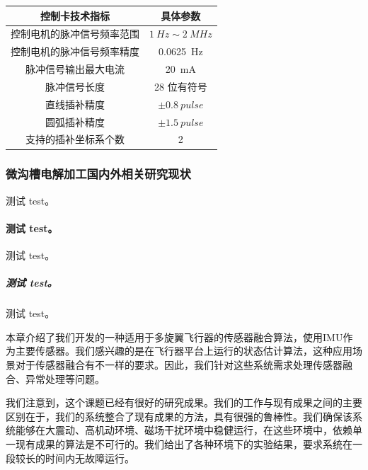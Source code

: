 \documentclass[
  type=master
]{gdutthesis}
\begin{document}
\begin{table}
  \label{tab:example}
  \begin{tabular}{cc}
    \toprule
    控制卡技术指标              & 具体参数                      \\
    \midrule
    控制电机的脉冲信号频率范围  & $\SI{1}{Hz}\sim\SI{2}{MHz}$ \\
    控制电机的脉冲信号频率精度  & \SI{0.0625}{Hz}              \\
    脉冲信号输出最大电流        & \SI{20}{mA}                  \\
    脉冲信号长度                & 28 位有符号                   \\
    直线插补精度                & $\pm \SI{0.8}{pulse}$        \\
    圆弧插补精度                & $\pm \SI{1.5}{pulse}$        \\
    支持的插补坐标系个数        & 2                             \\
    \bottomrule
  \end{tabular}
\end{table}


\subsubsection{微沟槽电解加工国内外相关研究现状}
测试 test。
\paragraph{测试 test。}
测试 test。
\subparagraph{测试 test。}
测试 test\cite{woerdelun2012jingji}。

本章介绍了我们开发的一种适用于多旋翼飞行器的传感器融合算法，使用IMU作为主要传感器。我们感兴趣的是在飞行器平台上运行的状态估计算法，这种应用场景对于传感器融合有不一样的要求。因此，我们针对这些系统需求处理传感器融合、异常处理等问题。\par
我们注意到，这个课题已经有很好的研究成果\cite{mahony2008nonlinear,hua2010attitude,khosravian2016state}。我们的工作与现有成果之间的主要区别在于，我们的系统整合了现有成果的方法，具有很强的鲁棒性。我们确保该系统能够在大震动、高机动环境、磁场干扰环境中稳健运行，在这些环境中，依赖单一现有成果的算法是不可行的。我们给出了各种环境下的实验结果，要求系统在一段较长的时间内无故障运行。\par
\end{document}
